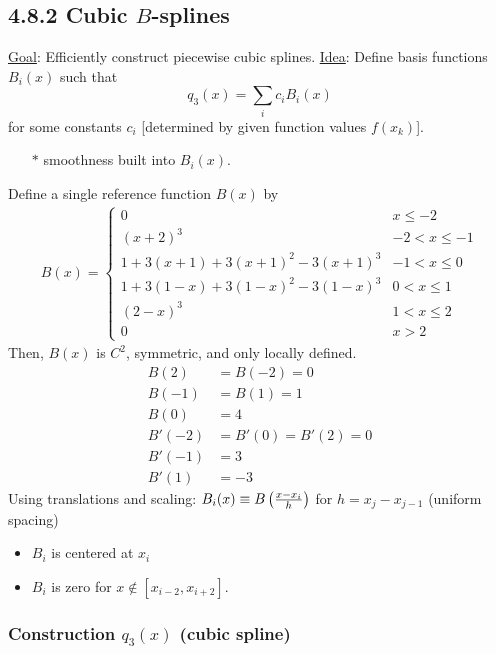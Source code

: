 \documentclass[]{article}
\begin{document}
\subsection*{4.8.2 Cubic $B$-splines}

\ul{Goal}: Efficiently construct piecewise cubic splines.
\ul{Idea}: Define basis functions $B_i(x)$ such that $$q_3(x) = \sum_i c_iB_i(x)$$ for some constants $c_i$ [determined by given function values $f(x_k)$].
\begin{enumerate}
	\item[$*$] smoothness built into $B_i(x)$.
\end{enumerate}
Define a single reference function $B(x)$ by
\begin{align*}
	B(x) =
	\begin{cases}
		0 & x\leq -2 \\
		(x+2)^3 & -2<x\leq-1 \\
		1+3(x+1)+3(x+1)^2-3(x+1)^3 & -1<x\leq0 \\
		1+3(1-x)+3(1-x)^2-3(1-x)^3 & 0<x\leq1 \\
		(2-x)^3 & 1<x\leq 2 \\
		0 & x > 2
	\end{cases}
\end{align*}
Then, $B(x)$ is $C^2$, symmetric, and only locally defined.
\begin{align*}
	B(2) &= B(-2) = 0 \\
	B(-1) &= B(1) = 1 \\
	B(0) &= 4 \\
	B'(-2) &= B'(0) = B'(2) = 0 \\
	B'(-1) &= 3 \\
	B'(1) &= -3
\end{align*}
Using translations and scaling:
$B_i(x) \equiv B\left(\frac{x-x_i}h\right)$ for $h=x_j-x_{j-1}$ (uniform spacing)
\begin{itemize}
	\item $B_i$ is centered at $x_i$
	\item $B_i$ is zero for $x\notin[x_{i-2},x_{i+2}]$.
\end{itemize}

\subsubsection*{Construction $q_3(x)$ (cubic spline)}
\end{document}
